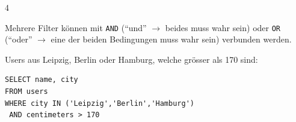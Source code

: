\begin{landscape}
\begin{multicols*}{4}
\begin{cheatSheetBox}[title=Zeilen Filtern: \texorpdfstring{\lstinline|WHERE|}{WHERE}]
\begin{table}[H]
  \centering
  \centering{}
\end{table}
\end{cheatSheetBox}
\begin{cheatSheetBox}[title=Filter kombinieren: \texorpdfstring{\lstinline|AND|, \lstinline|OR|}{AND, OR}]
Mehrere Filter können mit \lstinline|AND| (\enquote{und} $\rightarrow$ beides muss wahr sein) oder \lstinline|OR| (\enquote{oder} $\rightarrow$ eine der beiden Bedingungen muss wahr sein) verbunden werden.

Users aus Leipzig, Berlin oder Hamburg, welche grösser als 170 sind:
\begin{lstlisting}
SELECT name, city
FROM users 
WHERE city IN ('Leipzig','Berlin','Hamburg')
 AND centimeters > 170
\end{lstlisting}
\end{cheatSheetBox}


\end{multicols*}
\end{landscape}
